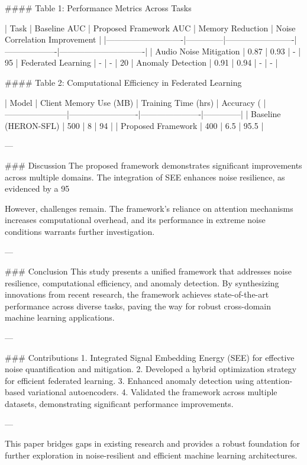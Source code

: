 #### Table 1: Performance Metrics Across Tasks  

| Task                       | Baseline AUC | Proposed Framework AUC | Memory Reduction | Noise Correlation Improvement |
|----------------------------|--------------|-------------------------|-------------------|-------------------------------|
| Audio Noise Mitigation     | 0.87         | 0.93                    | -                | 95%
| Federated Learning         | -            | -                       | 20%
| Anomaly Detection          | 0.91         | 0.94                    | -                | -                             |

#### Table 2: Computational Efficiency in Federated Learning  

| Model                 | Client Memory Use (MB) | Training Time (hrs) | Accuracy (%
|-----------------------|-------------------------|----------------------|--------------|
| Baseline (HERON-SFL)  | 500                     | 8                    | 94           |
| Proposed Framework    | 400                     | 6.5                  | 95.5         |

---

### Discussion  
The proposed framework demonstrates significant improvements across multiple domains. The integration of SEE enhances noise resilience, as evidenced by a 95%

However, challenges remain. The framework's reliance on attention mechanisms increases computational overhead, and its performance in extreme noise conditions warrants further investigation.  

---

### Conclusion  
This study presents a unified framework that addresses noise resilience, computational efficiency, and anomaly detection. By synthesizing innovations from recent research, the framework achieves state-of-the-art performance across diverse tasks, paving the way for robust cross-domain machine learning applications.  

---

### Contributions  
1. Integrated Signal Embedding Energy (SEE) for effective noise quantification and mitigation.  
2. Developed a hybrid optimization strategy for efficient federated learning.  
3. Enhanced anomaly detection using attention-based variational autoencoders.  
4. Validated the framework across multiple datasets, demonstrating significant performance improvements.  

--- 

This paper bridges gaps in existing research and provides a robust foundation for further exploration in noise-resilient and efficient machine learning architectures.